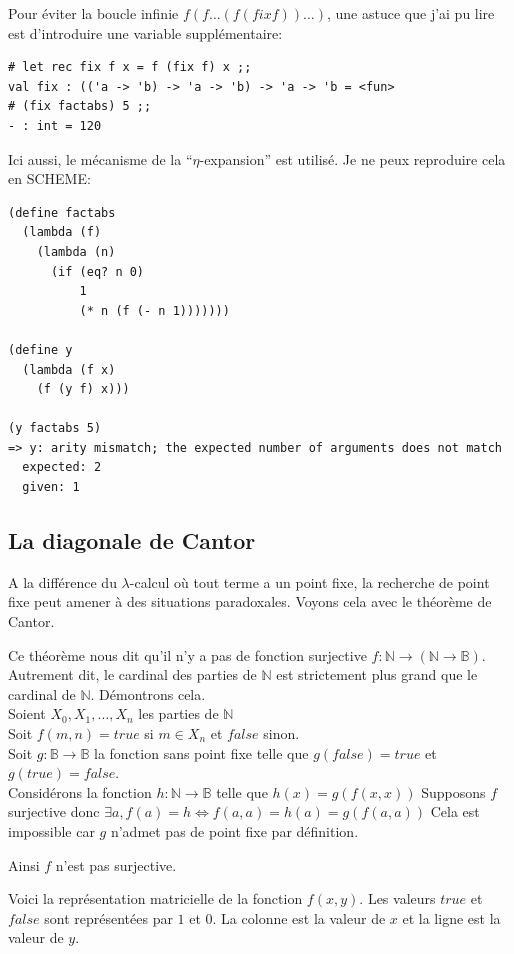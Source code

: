 Pour éviter la boucle infinie $f(f\ldots(f (fix f))\ldots)$, 
une astuce que j'ai pu lire est d'introduire une variable supplémentaire:

\begin{Verbatim}
# let rec fix f x = f (fix f) x ;;
val fix : (('a -> 'b) -> 'a -> 'b) -> 'a -> 'b = <fun>
# (fix factabs) 5 ;;
- : int = 120
\end{Verbatim}
Ici aussi, le mécanisme de la ``$\eta$-expansion'' est utilisé.
Je ne peux reproduire cela en SCHEME:

\begin{Verbatim}
(define factabs
  (lambda (f)
    (lambda (n)
      (if (eq? n 0)
          1
          (* n (f (- n 1)))))))

(define y
  (lambda (f x)
    (f (y f) x)))

(y factabs 5)
=> y: arity mismatch; the expected number of arguments does not match 
  expected: 2
  given: 1
\end{Verbatim}

\subsection{La diagonale de Cantor} %
 A la différence du $\lambda$-calcul où tout terme a un point fixe, la recherche de point fixe
peut amener à des situations paradoxales.
Voyons cela avec le théorème  de Cantor.


Ce théorème nous dit qu'il n'y a pas de fonction surjective 
$f: \mathbb{N} \rightarrow ( \mathbb{N} \rightarrow \mathbb{B}) $.
Autrement dit, le cardinal des parties de $\mathbb{N}$ est strictement plus grand que le cardinal de $\mathbb{N}$.
Démontrons cela. \\
Soient $X_0, X_1, \ldots, X_n$ les parties de $\mathbb{N}$  \\
Soit $f(m,n) = true$ si $m \in X_n$ et $false$ sinon. \\
Soit $g :\mathbb{B} \rightarrow \mathbb{B}$ la fonction sans point fixe telle que $g(false)=true$ et $g(true)=false$. \\
Considérons la fonction $h: \mathbb{N} \rightarrow \mathbb{B}$ telle que $h(x) = g(f(x,x))$
Supposons $f$ surjective donc $\exists a, f(a)= h \Leftrightarrow  f(a,a) = h(a) = g(f(a,a))$ 
Cela est impossible car $g$ n'admet pas de point fixe par définition.

Ainsi $f$ n'est pas surjective. \qedsymbol
\vspace{0.5cm}

Voici la représentation matricielle de la fonction $f(x,y)$. Les valeurs $true$ et $false$ sont représentées par $1$ et $0$.
La colonne est la valeur de $x$ et la ligne est la valeur de $y$.

